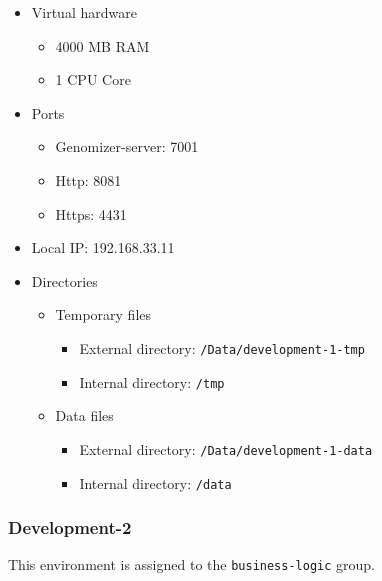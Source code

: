 \begin{itemize}
\itemsep1pt\parskip0pt
\item
  Virtual hardware

  \begin{itemize}
  \itemsep1pt\parskip0pt
  \item
    4000 MB RAM
  \item
    1 CPU Core
  \end{itemize}
\item
  Ports

  \begin{itemize}
  \itemsep1pt\parskip0pt
  \item
    Genomizer-server: 7001
  \item
    Http: 8081
  \item
    Https: 4431
  \end{itemize}
\item
  Local IP: 192.168.33.11
\item
  Directories

  \begin{itemize}
  \itemsep1pt\parskip0pt
  \item
    Temporary files

    \begin{itemize}
    \itemsep1pt\parskip0pt
    \item
      External directory: \texttt{/Data/development-1-tmp}
    \item
      Internal directory: \texttt{/tmp}
    \end{itemize}
  \item
    Data files

    \begin{itemize}
    \itemsep1pt\parskip0pt
    \item
      External directory: \texttt{/Data/development-1-data}
    \item
      Internal directory: \texttt{/data}
    \end{itemize}
  \end{itemize}
\end{itemize}

\subsubsection{Development-2}\label{sec:development-2}

This environment is assigned to the \texttt{business-logic} group.

